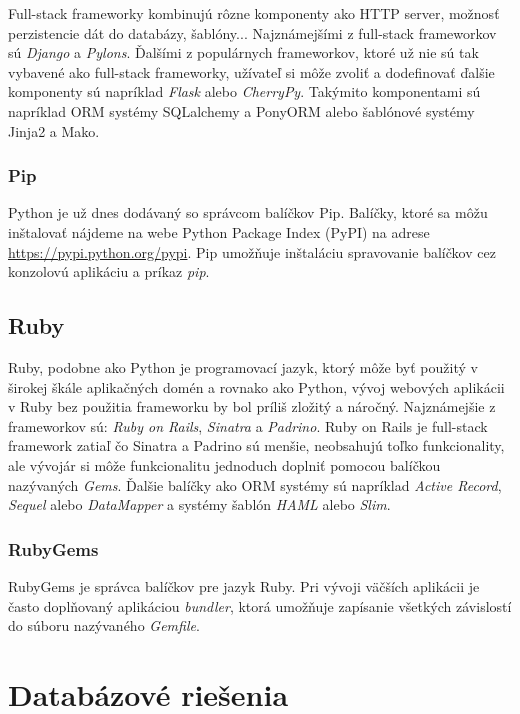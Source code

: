 Full-stack frameworky kombinujú rôzne komponenty ako HTTP server, možnosť perzistencie dát do databázy, šablóny... Najznámejšími z full-stack frameworkov sú \emph{Django} a \emph{Pylons}. Ďalšími z populárnych frameworkov, ktoré už nie sú tak vybavené ako full-stack frameworky, užívateľ si môže zvoliť a dodefinovať ďalšie komponenty sú napríklad \emph{Flask} alebo \emph{CherryPy}. Takýmito komponentami sú napríklad ORM systémy SQLalchemy a PonyORM alebo šablónové systémy Jinja2 a Mako.

\subsubsection*{Pip}

Python je už dnes dodávaný so správcom balíčkov Pip. Balíčky, ktoré sa môžu inštalovať nájdeme na webe Python Package Index (PyPI) na adrese \url{https://pypi.python.org/pypi}. Pip umožňuje inštaláciu spravovanie balíčkov cez konzolovú aplikáciu a príkaz \emph{pip}.

\subsection*{Ruby}

Ruby, podobne ako Python je programovací jazyk, ktorý môže byť použitý v širokej škále aplikačných domén a rovnako ako Python, vývoj webových aplikácii v Ruby bez použitia frameworku by bol príliš zložitý a náročný. Najznámejšie z frameworkov sú: \emph{Ruby on Rails}, \emph{Sinatra} a \emph{Padrino}. Ruby on Rails je full-stack framework zatiaľ čo Sinatra a Padrino sú menšie, neobsahujú toľko funkcionality, ale vývojár si môže funkcionalitu jednoduch doplniť pomocou balíčkou nazývaných \emph{Gems}. Ďalšie balíčky ako ORM systémy sú napríklad \emph{Active Record}, \emph{Sequel} alebo \emph{DataMapper} a systémy šablón \emph{HAML} alebo \emph{Slim}.

\subsubsection*{RubyGems}

RubyGems je správca balíčkov pre jazyk Ruby. Pri vývoji väčších aplikácii je často doplňovaný aplikáciou \emph{bundler}, ktorá umožňuje zapísanie všetkých závislostí do súboru nazývaného \emph{Gemfile}.


\section{Databázové riešenia}

